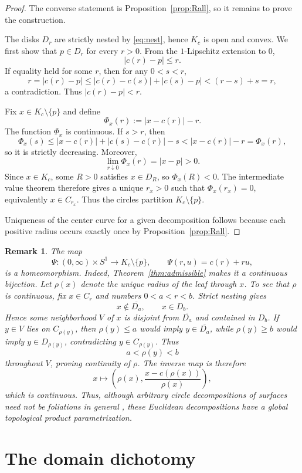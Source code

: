 \documentclass[11pt]{article}
\newtheorem{remark}[theorem]{Remark}
\newcommand{\ol}{\overline}
\begin{document}
\begin{proof}
The converse statement is Proposition~\ref{prop:Rall}, so it remains to prove the construction.

The disks $D_r$ are strictly nested by \eqref{eq:nest}, hence $K_c$ is open and convex. We first show that $p\in D_r$ for every $r>0$. From the $1$-Lipschitz extension to $0$,
\[
|c(r)-p|\le r.
\]
If equality held for some $r$, then for any $0<s<r$,
\[
r=|c(r)-p|
\le |c(r)-c(s)|+|c(s)-p|
<(r-s)+s=r,
\]
a contradiction. Thus $|c(r)-p|<r$.

Fix $x\in K_c\setminus\{p\}$ and define
\[
\Phi_x(r):=|x-c(r)|-r.
\]
The function $\Phi_x$ is continuous. If $s>r$, then
\[
\Phi_x(s)
\le |x-c(r)|+|c(s)-c(r)|-s
<|x-c(r)|-r
=\Phi_x(r),
\]
so it is strictly decreasing. Moreover,
\[
\lim_{r\downarrow0}\Phi_x(r)=|x-p|>0.
\]
Since $x\in K_c$, some $R>0$ satisfies $x\in D_R$, so $\Phi_x(R)<0$. The intermediate value theorem therefore gives a unique $r_x>0$ such that $\Phi_x(r_x)=0$, equivalently $x\in C_{r_x}$. Thus the circles partition $K_c\setminus\{p\}$.

Uniqueness of the center curve for a given decomposition follows because each positive radius occurs exactly once by Proposition~\ref{prop:Rall}.
\end{proof}

\begin{remark}\label{rem:product}
The map
\[
\Psi:(0,\infty)\times S^1\longrightarrow K_c\setminus\{p\},
\qquad
\Psi(r,u)=c(r)+ru,
\]
is a homeomorphism. Indeed, Theorem~\ref{thm:admissible} makes it a continuous bijection. Let $\rho(x)$ denote the unique radius of the leaf through $x$. To see that $\rho$ is continuous, fix $x\in C_r$ and numbers $0<a<r<b$. Strict nesting gives
\[
x\notin\ol{D_a},\qquad x\in D_b.
\]
Hence some neighborhood $V$ of $x$ is disjoint from $\ol{D_a}$ and contained in $D_b$. If $y\in V$ lies on $C_{\rho(y)}$, then $\rho(y)\le a$ would imply $y\in\ol{D_a}$, while $\rho(y)\ge b$ would imply $y\in D_{\rho(y)}$, contradicting $y\in C_{\rho(y)}$. Thus
\[
a<\rho(y)<b
\]
throughout $V$, proving continuity of $\rho$. The inverse map is therefore
\[
x\longmapsto
\left(\rho(x),\frac{x-c(\rho(x))}{\rho(x)}\right),
\]
which is continuous. Thus, although arbitrary circle decompositions of surfaces need not be foliations in general \cite{MoussongSimanyi}, these Euclidean decompositions have a global topological product parametrization.
\end{remark}

\section{The domain dichotomy}
\end{document}
